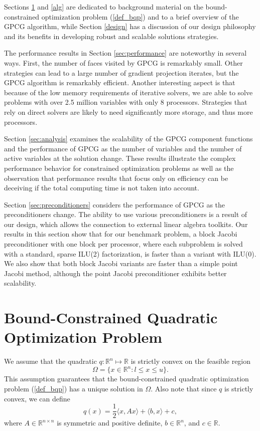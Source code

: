 \documentclass{esub2acm}
\newcommand{\Ref}[1]{\mbox{\rm{(\ref{#1})}}}
\newcommand{\half}{{\textstyle{\frac{1}{2}}}}
\newcommand{\R}{\mbox{${\mathbb R}$}}
\begin{document}
Sections \ref{qp} and \ref{alg} are dedicated to
background material on the bound-constrained 
optimization problem \Ref{def_bqp} and to
a brief overview of the GPCG algorithm, while
Section \ref{design} has a discussion
of our design philosophy and its benefits in
developing robust and scalable solutions strategies.

The performance results
in Section \ref{sec:performance} are noteworthy in several ways.
First, the number of faces visited by GPCG is remarkably small.
Other strategies can lead to a large number of gradient projection
iterates, but the GPCG algorithm is remarkably efficient.
Another interesting aspect is that because of the
low memory requirements of iterative solvers, we are able
to solve problems with over 2.5 million variables
with only $ 8 $ processors.
Strategies that rely on direct solvers are likely to need
significantly more storage, and thus more processors.

Section \ref{sec:analysis} examines the scalability of the
GPCG component functions and the performance of GPCG
as the number of variables and the number of active
variables at the solution change. These results illustrate the
complex performance behavior for constrained optimization
problems as well as the observation that
performance results that focus only on efficiency can be
deceiving if the total computing time is not taken into account.

Section \ref{sec:preconditioners} considers the performance
of GPCG as the preconditioners change. The
ability to use various preconditioners is
a result of our design, which allows the
connection to external linear algebra toolkits.
Our results in this section show that for our benchmark
problem, a block Jacobi preconditioner with
one block per processor, where each subproblem is solved
with a standard, sparse ILU(2) factorization, is faster than
a variant with ILU(0). We also show that both block Jacobi variants are faster
than a simple point Jacobi method,
although the point Jacobi preconditioner exhibits
better scalability.





\section{Bound-Constrained Quadratic Optimization Problem}

\label{qp}

We assume that the quadratic $q : \R^n \mapsto \R $ is strictly convex
on the feasible region
\begin{equation} \label{def_bounds}
\Omega = \{ x \in \R^n: l \leq x \leq u \} .
\end{equation}
This assumption guarantees that the bound-constrained 
quadratic optimization problem (\ref{def_bqp}) has a unique solution
in  $\Omega$.
Also note that since $q$ is strictly convex, we can define
\begin{equation} \label{def-quadratic}
q(x) = \half \langle x , {A} x \rangle + \langle b , x \rangle + c,
\end{equation}
where $A \in \R^{n \times n}$ is symmetric and
positive definite, $ b \in \R^n$, and $c \in \R$.
\end{document}
